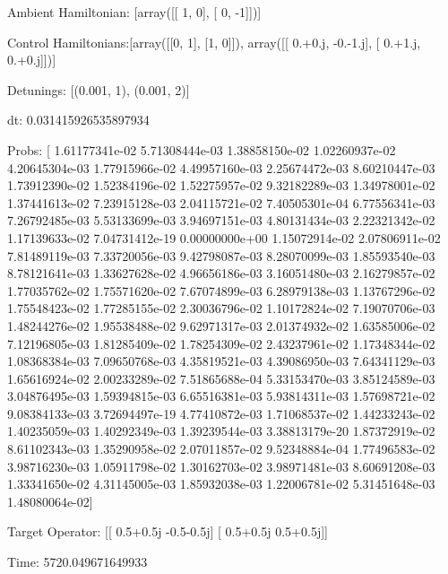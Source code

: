 \documentclass{article}
\begin{document}
    

\newpage

Ambient Hamiltonian: [array([[ 1,  0],
       [ 0, -1]])]

Control Hamiltonians:[array([[0, 1],
       [1, 0]]), array([[ 0.+0.j, -0.-1.j],
       [ 0.+1.j,  0.+0.j]])]

Detunings: [(0.001, 1), (0.001, 2)]

 dt: 0.031415926535897934

Probs: [  1.61177341e-02   5.71308444e-03   1.38858150e-02   1.02260937e-02
   4.20645304e-03   1.77915966e-02   4.49957160e-03   2.25674472e-03
   8.60210447e-03   1.73912390e-02   1.52384196e-02   1.52275957e-02
   9.32182289e-03   1.34978001e-02   1.37441613e-02   7.23915128e-03
   2.04115721e-02   7.40505301e-04   6.77556341e-03   7.26792485e-03
   5.53133699e-03   3.94697151e-03   4.80131434e-03   2.22321342e-02
   1.17139633e-02   7.04731412e-19   0.00000000e+00   1.15072914e-02
   2.07806911e-02   7.81489119e-03   7.33720056e-03   9.42798087e-03
   8.28070099e-03   1.85593540e-03   8.78121641e-03   1.33627628e-02
   4.96656186e-03   3.16051480e-03   2.16279857e-02   1.77035762e-02
   1.75571620e-02   7.67074899e-03   6.28979138e-03   1.13767296e-02
   1.75548423e-02   1.77285155e-02   2.30036796e-02   1.10172824e-02
   7.19070706e-03   1.48244276e-02   1.95538488e-02   9.62971317e-03
   2.01374932e-02   1.63585006e-02   7.12196805e-03   1.81285409e-02
   1.78254309e-02   2.43237961e-02   1.17348344e-02   1.08368384e-03
   7.09650768e-03   4.35819521e-03   4.39086950e-03   7.64341129e-03
   1.65616924e-02   2.00233289e-02   7.51865688e-04   5.33153470e-03
   3.85124589e-03   3.04876495e-03   1.59394815e-03   6.65516381e-03
   5.93814311e-03   1.57698721e-02   9.08384133e-03   3.72694497e-19
   4.77410872e-03   1.71068537e-02   1.44233243e-02   1.40235059e-03
   1.40292349e-03   1.39239544e-03   3.38813179e-20   1.87372919e-02
   8.61102343e-03   1.35290958e-02   2.07011857e-02   9.52348884e-04
   1.77496583e-02   3.98716230e-03   1.05911798e-02   1.30162703e-02
   3.98971481e-03   8.60691208e-03   1.33341650e-02   4.31145005e-03
   1.85932038e-03   1.22006781e-02   5.31451648e-03   1.48080064e-02]

Target Operator: [[ 0.5+0.5j -0.5-0.5j]
 [ 0.5+0.5j  0.5+0.5j]]

Time: 5720.049671649933
\end{document}
